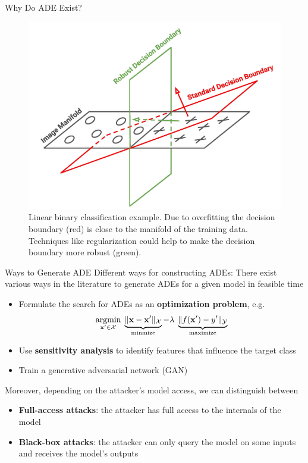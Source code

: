 \documentclass[10pt,compress,t,notes=noshow, xcolor=table]{beamer}
\begin{document}
\begin{frame}{Why Do ADE Exist?}
{    \begin{figure}
        \centering
        \includegraphics[width = .35\textwidth]{figure/tilting_ae.png}
        \caption{Linear binary classification example. Due to overfitting the decision boundary (red) is close to the manifold of the training data. Techniques like regularization could help to make the decision boundary more robust (green). 
}
    \end{figure}
}
    
    
\end{frame}


\begin{vbframe}[c]{Ways to Generate ADE}
Different ways for constructing ADEs:
There exist various ways in the literature to generate ADEs for a given model in feasible time
\begin{itemize}
    \item Formulate the search for ADEs as an \textbf{optimization problem}, e.g. 
    \begin{equation*}
        \label{eq:optimization}
        \underset{\mathbf{x}'\in \mathcal{X}}{\text{argmin}}\; \underbrace{\| \mathbf{x}-\mathbf{x}' \|_{\mathcal{X}}}_{\text{minmize}} - \lambda\;   \underbrace{ \|f(\mathbf{x}')-y'\|_{\mathcal{Y}}}_{\text{maximize}}
    \end{equation*}
    \item Use \textbf{sensitivity analysis} to identify features that influence the target class
    \item Train a generative adversarial network (GAN) 
\end{itemize}
Moreover, depending on the attacker's model access, we can distinguish between
\begin{itemize}
    \item \textbf{Full-access attacks}: the attacker has full access to the internals of the model
    \item \textbf{Black-box attacks}: the attacker can only query the model on some inputs and receives the model's outputs
\end{itemize}
\end{vbframe}
\end{document}
